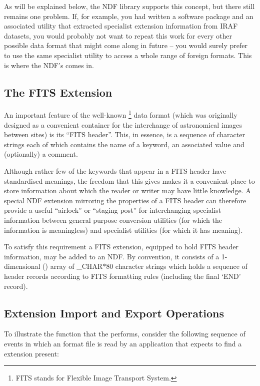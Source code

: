 As will be explained below, the NDF library supports this concept, but
there still remains one problem. If, for example, you had written a
software package and an associated utility that extracted specialist
extension information from IRAF datasets, you would probably not want
to repeat this work for every other possible data format that might
come along in future -- you would surely prefer to use the same
specialist utility to access a whole range of foreign formats. This is
where the NDF's 
comes in.

\subsection{\label{sect:fitsextension}The FITS Extension}
An important feature of the well-known
\footnote{FITS stands for Flexible Image Transport System.} data
format (which was originally designed as a convenient container for
the interchange of astronomical images between sites) is its ``FITS
header''. This, in essence, is a sequence of character strings each of
which contains the name of a keyword, an associated value and
(optionally) a comment.

Although rather few of the keywords that appear in a FITS header have
standardised meanings, the freedom that this gives makes it a
convenient place to store information about which the reader or writer
may have little knowledge.  A special NDF extension mirroring the
properties of a FITS header can therefore provide a useful ``airlock''
or ``staging post'' for interchanging specialist information between
general purpose conversion utilities (for which the information is
meaningless) and specialist utilities (for which it has meaning).

To satisfy this requirement a FITS extension, equipped to hold FITS
header information, may be added to an NDF. By convention, it consists
of a 1-dimensional () array of \_CHAR$*$80
character strings which holds a sequence of header records according
to FITS formatting rules (including the final `END' record).

\subsection{Extension Import and Export Operations}

To illustrate the function that the  performs, consider the following
sequence of events in which an  format file is
read by an application that expects to find a 
extension present:

